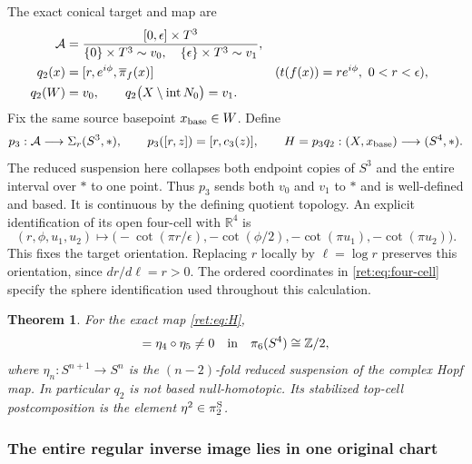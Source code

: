 \documentclass[11pt]{article}
\newtheorem{theorem}{Theorem}[section]
\theoremstyle{definition}
\begin{document}
The exact conical target and map are
\begin{align}
 \mathcal A&=
 \frac{[0,\epsilon]\times T^3}
 {\{0\}\times T^3\sim v_0,\quad
  \{\epsilon\}\times T^3\sim v_1},
 \label{ret:eq:A-target}\\
 q_2(x)&=[r,e^{i\phi},\overline\pi_f(x)]
       &&(t(f(x))=re^{i\phi},\ 0<r<\epsilon),\notag\\
 q_2(W)&=v_0,\qquad
 q_2\bigl(X\setminus\operatorname{int}N_0\bigr)=v_1.
 \label{ret:eq:q2}
\end{align}
Fix the same source basepoint \(x_{\rm base}\in W\).  Define
\begin{equation}
 p_3:\mathcal A\longrightarrow\Sigma_r(S^3,*),\qquad
 p_3([r,z])=[r,c_3(z)],\qquad
 H=p_3q_2:(X,x_{\rm base})\longrightarrow(S^4,*).
 \label{ret:eq:H}
\end{equation}
The reduced suspension here collapses both endpoint copies of \(S^3\)
and the entire interval over \(*\) to one point.  Thus \(p_3\) sends
both \(v_0\) and \(v_1\) to \(*\) and is well-defined and based.
It is continuous by the defining quotient topology.  An explicit
identification of its open four-cell with \(\mathbb R^4\) is
\begin{equation}
 (r,\phi,u_1,u_2)\longmapsto
 \bigl(-\cot(\pi r/\epsilon),-\cot(\phi/2),
       -\cot(\pi u_1),-\cot(\pi u_2)\bigr).
 \label{ret:eq:four-cell}
\end{equation}
This fixes the target orientation.  Replacing \(r\) locally by
\(\ell=\log r\) preserves this orientation, since \(dr/d\ell=r>0\).
The ordered coordinates in \eqref{ret:eq:four-cell} specify the sphere
identification used throughout this calculation.

\begin{theorem}
\label{ret:main}
For the exact map \eqref{ret:eq:H},
\begin{equation}
 [H]=\eta_4\circ\eta_5\ne0
       \quad\hbox{in}\quad\pi_6(S^4)\cong\mathbb Z/2,
 \label{ret:eq:main-class}
\end{equation}
where \(\eta_n:S^{n+1}\to S^n\) is the \((n-2)\)-fold reduced
suspension of the complex Hopf map.  In particular \(q_2\) is not
based null-homotopic.  Its stabilized top-cell postcomposition is the
element \(\eta^2\in\pi_2^{\rm S}\).
\end{theorem}

\subsubsection{The entire regular inverse image lies in one original chart}
\end{document}
